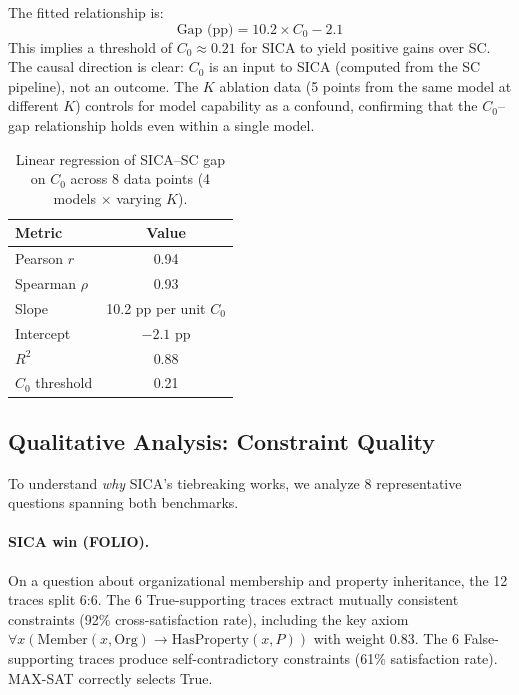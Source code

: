 \documentclass[11pt,a4paper]{article}
\begin{document}
The fitted relationship is:
\begin{equation}
    \text{Gap (pp)} = 10.2 \times C_0 - 2.1
\end{equation}
This implies a threshold of $C_0 \approx 0.21$ for SICA to yield positive gains over SC.
The causal direction is clear: $C_0$ is an input to SICA (computed from the SC pipeline), not an outcome.
The $K$ ablation data (5 points from the same model at different $K$) controls for model capability as a confound, confirming that the $C_0$--gap relationship holds even within a single model.

\begin{table}[t]
\centering
\small
\begin{tabular}{lc}
\toprule
\textbf{Metric} & \textbf{Value} \\
\midrule
Pearson $r$     & 0.94 \\
Spearman $\rho$ & 0.93 \\
Slope           & 10.2 pp per unit $C_0$ \\
Intercept       & $-2.1$ pp \\
$R^2$           & 0.88 \\
$C_0$ threshold & 0.21 \\
\bottomrule
\end{tabular}
\caption{Linear regression of SICA--SC gap on $C_0$ across 8 data points (4 models $\times$ varying $K$).}
\label{tab:c0_regression}
\end{table}


\subsection{Qualitative Analysis: Constraint Quality}
\label{sec:qualitative}

To understand \emph{why} SICA's tiebreaking works, we analyze 8 representative questions spanning both benchmarks.

\paragraph{SICA win (FOLIO).}
On a question about organizational membership and property inheritance, the 12 traces split 6:6.
The 6 True-supporting traces extract mutually consistent constraints (92\% cross-satisfaction rate), including the key axiom $\forall x(\text{Member}(x, \text{Org}) \to \text{HasProperty}(x, P))$ with weight 0.83.
The 6 False-supporting traces produce self-contradictory constraints (61\% satisfaction rate).
MAX-SAT correctly selects True.
\end{document}
